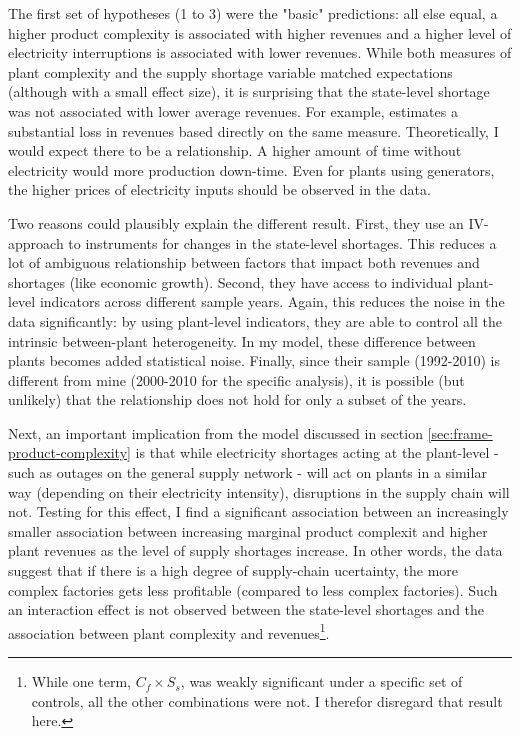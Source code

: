 \documentclass[11pt]{article}
\begin{document}
The first set of hypotheses (1 to 3) were the "basic" predictions: all else equal, a higher product complexity is associated with higher revenues and a higher level of electricity interruptions is associated with lower revenues. While both measures of plant complexity and the supply shortage variable matched expectations (although with a small effect size), it is surprising that the state-level shortage was not associated with lower average revenues. For example, \cite{allcott_how_2016} estimates a substantial loss in revenues based directly on the same measure. Theoretically, I would expect there to be a relationship. A higher amount of time without electricity would more production down-time. Even for plants using generators, the higher prices of electricity inputs should be observed in the data.

Two reasons could plausibly explain the different result. First, they use an IV-approach to instruments for changes in the state-level shortages. This reduces a lot of ambiguous relationship between factors that impact both revenues and shortages (like economic growth). Second, they have access to individual plant-level indicators across different sample years. Again, this reduces the noise in the data significantly: by using plant-level indicators, they are able to control all the intrinsic between-plant heterogeneity. In my model, these difference between plants becomes added statistical noise. Finally, since their sample (1992-2010) is different from mine (2000-2010 for the specific analysis), it is possible (but unlikely) that the relationship does not hold for only a subset of the years.

Next, an important implication from the model discussed in section \ref{sec:frame-product-complexity} is that while electricity shortages acting at the plant-level - such as outages on the general supply network - will act on plants in a similar way (depending on their electricity intensity), disruptions in the supply chain will not. Testing for this effect, I find a significant association between an increasingly smaller association between increasing marginal product complexit and higher plant revenues as the level of supply shortages increase. In other words, the data suggest that if there is a high degree of supply-chain ucertainty, the more complex factories gets less profitable (compared to less complex factories). Such an interaction effect is not observed between the state-level shortages and the association between plant complexity and revenues\footnote{While one term, $C_f \times S_{s}$, was weakly significant under a specific set of controls, all the other combinations were not. I therefor disregard that result here.}.
\end{document}
